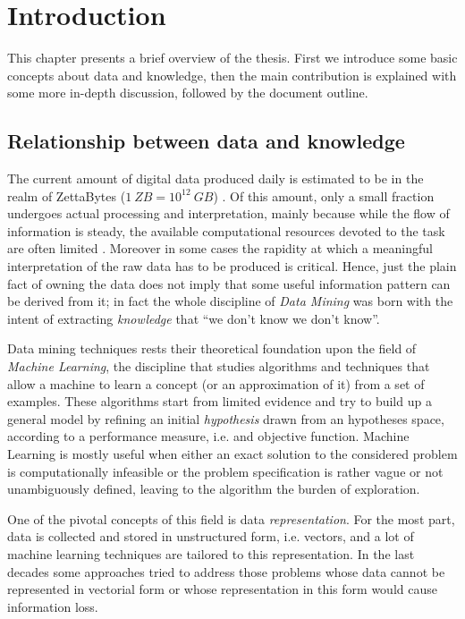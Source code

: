 
\chapter{Introduction} %
\label{Chapter1} %

This chapter presents a brief overview of the thesis.
First we introduce some basic concepts about data and knowledge,
then the main contribution is explained with some more in-depth discussion,
followed by the document outline.

\section{Relationship between data and knowledge}

The current amount of digital data produced daily is estimated to be in the realm of 
ZettaBytes ($1~ZB = 10^{12}~GB$) \cite{idc}.
Of this amount, only a small fraction undergoes actual processing and interpretation,
mainly because while the flow of information is steady, the available computational resources
devoted to the task are often limited \cite{idc}.
Moreover in some cases the rapidity at which a meaningful interpretation of the 
raw data has to be produced is critical.
Hence, just the plain fact of owning the data does not imply that some useful 
information pattern can be derived from it; in fact the whole discipline of \emph{Data Mining}
was born with the intent of extracting \emph{knowledge} that ``we don't know we don't know''.

Data mining techniques rests their theoretical foundation upon the field of \emph{Machine Learning},
the discipline that studies algorithms and techniques that allow a machine
to learn a concept (or an approximation of it) from a set of examples.
These algorithms start from limited evidence and try to build up a general model
by refining an initial \emph{hypothesis} drawn from an hypotheses space,
according to a performance measure, i.e. and objective function.
Machine Learning is mostly useful when either an exact solution to the considered
problem is computationally infeasible or the problem specification
is rather vague or not unambiguously defined, leaving to the algorithm the burden
of exploration.

One of the pivotal concepts of this field is data \emph{representation}.
For the most part, data is collected and stored in unstructured form, i.e. vectors,
and a lot of machine learning techniques are tailored to this representation.
In the last decades some approaches tried to address those problems whose data cannot
be represented in vectorial form or whose representation in this form would cause
information loss.

